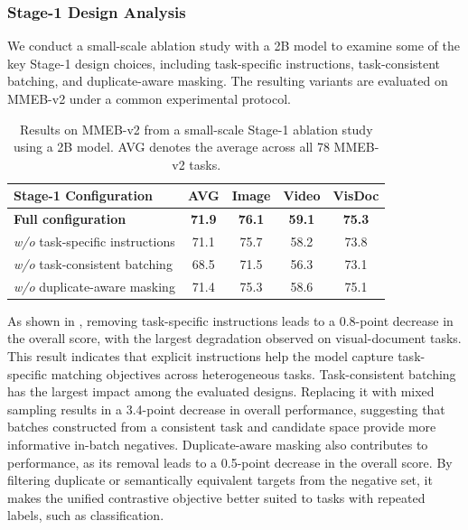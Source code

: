 \documentclass[]{wechat}
\begin{document}
\subsubsection{Stage-1 Design Analysis}
\label{subsec:stage1_ablation}

We conduct a small-scale ablation study with a 2B model to examine some of the key Stage-1 design choices, including task-specific instructions, task-consistent batching, and duplicate-aware masking. The resulting variants are evaluated on MMEB-v2 under a common experimental protocol.

\begin{table}[htbp]
\centering
\small
\setlength{\tabcolsep}{5.5pt}
\renewcommand{\arraystretch}{1.06}
\begin{tabular}{lcccc}
\toprule
\textbf{Stage-1 Configuration} & \textbf{AVG} & \textbf{Image} & \textbf{Video} & \textbf{VisDoc} \\
\midrule
\textbf{Full configuration} & \textbf{71.9} & \textbf{76.1} & \textbf{59.1} & \textbf{75.3} \\
\quad \textit{w/o} task-specific instructions & 71.1 & 75.7 & 58.2 & 73.8 \\
\quad \textit{w/o} task-consistent batching & 68.5 & 71.5 & 56.3 & 73.1 \\
\quad \textit{w/o} duplicate-aware masking & 71.4 & 75.3 & 58.6 & 75.1 \\
\bottomrule
\end{tabular}
\caption{Results on MMEB-v2 from a small-scale Stage-1 ablation study using a 2B model. AVG denotes the average across all 78 MMEB-v2 tasks.}
\label{tab:stage1_ablation}
\end{table}

As shown in , removing task-specific instructions leads to a 0.8-point decrease in the overall score, with the largest degradation observed on visual-document tasks. This result indicates that explicit instructions help the model capture task-specific matching objectives across heterogeneous tasks. Task-consistent batching has the largest impact among the evaluated designs. Replacing it with mixed sampling results in a 3.4-point decrease in overall performance, suggesting that batches constructed from a consistent task and candidate space provide more informative in-batch negatives. Duplicate-aware masking also contributes to performance, as its removal leads to a 0.5-point decrease in the overall score. By filtering duplicate or semantically equivalent targets from the negative set, it makes the unified contrastive objective better suited to tasks with repeated labels, such as classification.
\end{document}
